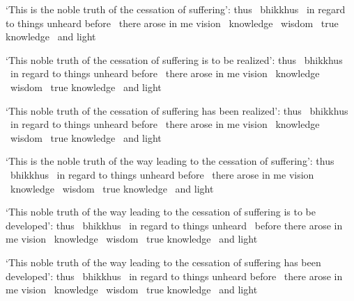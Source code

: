 \begin{english-only-hang}
  `This is the noble truth of the cessation of suffering': thus \breathmark\ bhikkhus \breathmark\ in regard to things unheard before \breathmark\ there arose in me vision \breathmark\ knowledge \breathmark\ wisdom \breathmark\ true knowledge \breathmark\ and light
\end{english-only-hang}

\begin{english-only-hang}
  `This noble truth of the cessation of suffering is to be realized': thus \breathmark\ bhikkhus \breathmark\ in regard to things unheard before \breathmark\ there arose in me vision \breathmark\ knowledge \breathmark\ wisdom \breathmark\ true knowledge \breathmark\ and light
\end{english-only-hang}

\begin{english-only-hang}
  `This noble truth of the cessation of suffering has been realized': thus \breathmark\ bhikkhus \breathmark\ in regard to things unheard before \breathmark\ there arose in me vision \breathmark\ knowledge \breathmark\ wisdom \breathmark\ true knowledge \breathmark\ and light
\end{english-only-hang}

\begin{english-only-hang}
  `This is the noble truth of the way leading to the cessation of suffering': thus \breathmark\ bhikkhus \breathmark\ in regard to things unheard before \breathmark\ there arose in me vision \breathmark\ knowledge \breathmark\ wisdom \breathmark\ true knowledge \breathmark\ and light
\end{english-only-hang}

\begin{english-only-hang}
  `This noble truth of the way leading to the cessation of suffering is to be developed': thus \breathmark\ bhikkhus \breathmark\ in regard to things unheard \breathmark\ before there arose in me vision \breathmark\ knowledge \breathmark\ wisdom \breathmark\ true knowledge \breathmark\ and light
\end{english-only-hang}

\begin{english-only-hang}
  `This noble truth of the way leading to the cessation of suffering has been developed': thus \breathmark\ bhikkhus \breathmark\ in regard to things unheard before \breathmark\ there arose in me vision \breathmark\ knowledge \breathmark\ wisdom \breathmark\ true knowledge \breathmark\ and light
\end{english-only-hang}

